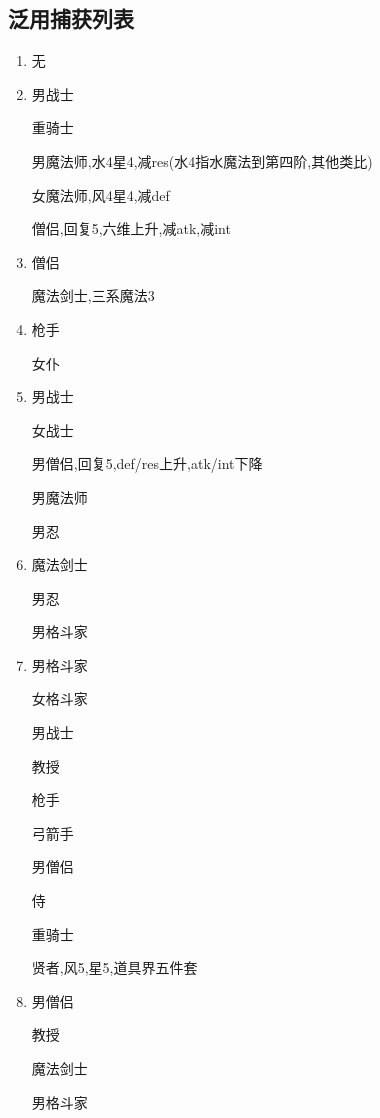 	\newpage

	\subsection{泛用捕获列表}

	\begin{enumerate}\label{sec:泛用捕获列表}
		\item
		无
		\item
		男战士

		重骑士

		男魔法师,水4星4,减res(水4指水魔法到第四阶,其他类比)

		女魔法师,风4星4,减def

		僧侣,回复5,六维上升,减atk,减int

		\item
		{\color{red}{男忍,减hit,减spd,五系异常(毒眠麻忘魅)}}

		僧侣

		魔法剑士,三系魔法3
		
		\item
		枪手

		女仆

		{\color{red}{教授,星4,攻击属性上升(atk,int,hit,spd)}}

		\item
		男战士

		女战士

		男僧侣,回复5,def/res上升,atk/int下降

		男魔法师

		男忍

		\item
		魔法剑士

		男忍

		男格斗家

		\item
		男格斗家

		女格斗家

		男战士

		教授

		枪手

		弓箭手

		男僧侣

		侍

		重骑士

		贤者,风5,星5,道具界五件套
		
		\item
		男僧侣

		教授

		魔法剑士
		
		男格斗家


\end{enumerate}
